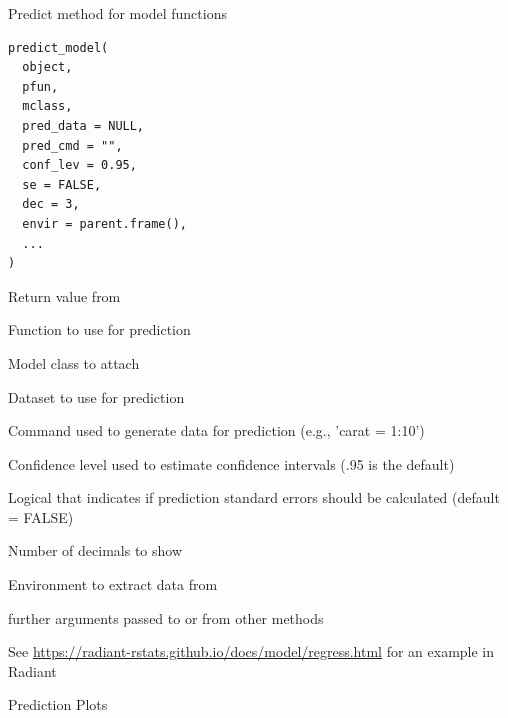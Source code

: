 \documentclass[a4paper]{book}
\begin{document}
%
\begin{Description}
Predict method for model functions
\end{Description}
%
\begin{Usage}
\begin{verbatim}
predict_model(
  object,
  pfun,
  mclass,
  pred_data = NULL,
  pred_cmd = "",
  conf_lev = 0.95,
  se = FALSE,
  dec = 3,
  envir = parent.frame(),
  ...
)
\end{verbatim}
\end{Usage}
%
\begin{Arguments}
\begin{ldescription}
\item[\code{object}] Return value from 

\item[\code{pfun}] Function to use for prediction

\item[\code{mclass}] Model class to attach

\item[\code{pred\_data}] Dataset to use for prediction

\item[\code{pred\_cmd}] Command used to generate data for prediction (e.g., 'carat = 1:10')

\item[\code{conf\_lev}] Confidence level used to estimate confidence intervals (.95 is the default)

\item[\code{se}] Logical that indicates if prediction standard errors should be calculated (default = FALSE)

\item[\code{dec}] Number of decimals to show

\item[\code{envir}] Environment to extract data from

\item[\code{...}] further arguments passed to or from other methods
\end{ldescription}
\end{Arguments}
%
\begin{Details}
See \url{https://radiant-rstats.github.io/docs/model/regress.html} for an example in Radiant
\end{Details}
%
\begin{Description}
Prediction Plots
\end{Description}
\end{document}

